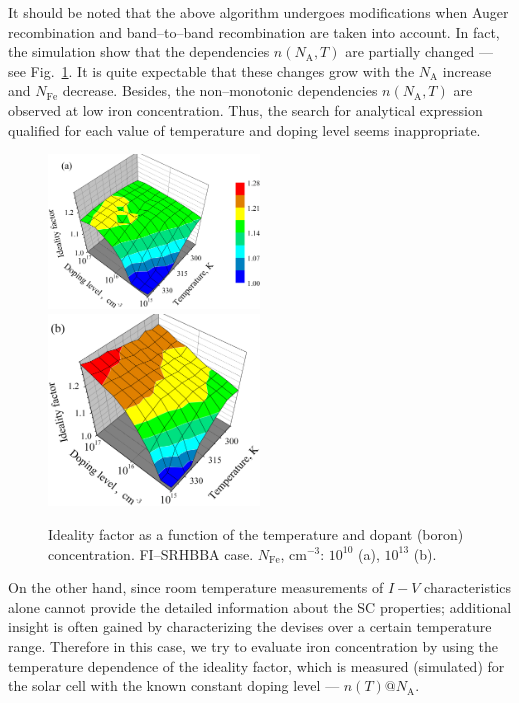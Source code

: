 \documentclass [sort&compress] {elsarticle}
\begin{document}
It should be noted that the above algorithm undergoes modifications when Auger recombination and band--to--band recombination are taken into account.
In fact, the simulation show that the dependencies $n(N_\mathrm{A},T)$ are partially changed --- see Fig.~\ref{fig5}.
It is quite expectable that these changes grow with the $N_\mathrm{A}$ increase and $N_\mathrm{Fe}$ decrease.
Besides, the non--monotonic dependencies $n(N_\mathrm{A},T)$ are observed at low iron concentration.
Thus, the search for analytical expression qualified for each value of temperature and doping level seems inappropriate.

\begin{figure}
\includegraphics[width=0.5\textwidth]{Fig5a}%
\includegraphics[width=0.5\textwidth]{Fig5b}
\caption{\label{fig5}
Ideality factor as a function of the temperature and dopant (boron) concentration.
FI--SRHBBA case.
$N_\mathrm{Fe}$, cm$^{-3}$: $10^{10}$ (a), $10^{13}$ (b).
}%
\end{figure}

On the other hand, since room temperature measurements of $I-V$ characteristics alone cannot provide the detailed information about the SC properties;
additional insight is often gained by characterizing  the devises over a certain temperature range.
Therefore in this case, we try to evaluate iron concentration by using the temperature dependence of the ideality factor,
which is measured (simulated)  for the solar cell with  the known constant doping level --- $n(T)@ N_\mathrm{A}$.
\end{document}
